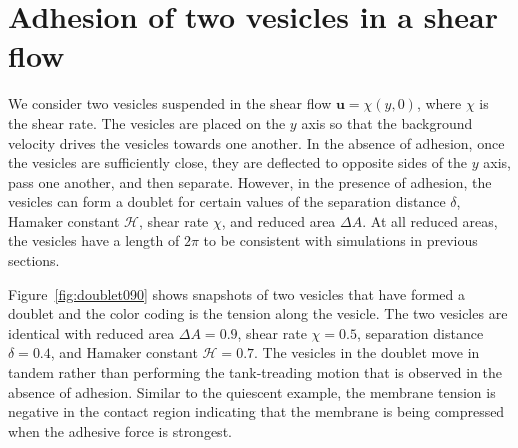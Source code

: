 \documentclass[prf,superscriptaddress,showkeys]{revtex4-1}
\newcommand{\uu}{\mathbf{u}}
\begin{document}
\section{Adhesion of two vesicles in a shear flow}
\label{sec:sflow} 
We consider two vesicles suspended in the shear flow $\uu = \chi(y,0)$,
where $\chi$ is the shear rate.  The vesicles are placed on the $y$ axis
so that the background velocity drives the vesicles towards one another.
In the absence of adhesion, once the vesicles are sufficiently close,
they are deflected to opposite sides of the $y$ axis, pass one another,
and then separate.  However, in the presence of adhesion, the vesicles
can form a doublet for certain values of the separation distance
$\delta$, Hamaker constant $\mathcal{H}$, shear rate $\chi$, and reduced
area $\Delta A$.  
At all reduced areas, the vesicles have a length of
$2\pi$ to be consistent with simulations in previous sections.  

Figure~\ref{fig:doublet090} shows snapshots of two vesicles
that have formed a doublet and the color coding is the tension along the
vesicle.  The two vesicles are identical with reduced area $\Delta A =
0.9$, shear rate $\chi = 0.5$, separation distance $\delta = 0.4$, and
Hamaker constant $\mathcal{H} = 0.7$.  The vesicles in the doublet move
in tandem rather than performing the tank-treading motion that is
observed in the absence of adhesion.  Similar to the quiescent example,
the membrane tension is negative in the contact region indicating that
the membrane is being compressed when the adhesive force is strongest.
\end{document}
